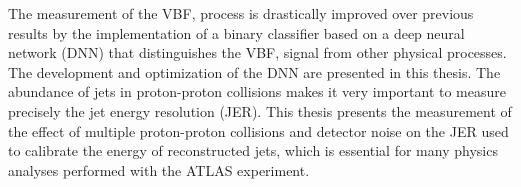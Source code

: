 The measurement of the VBF, \HWW process is drastically improved over previous results by the implementation of a binary classifier based on a deep neural network (DNN) that distinguishes the VBF, \HWW signal from other physical processes. 
The development and optimization of the DNN are presented in this thesis. 
The abundance of jets in proton-proton collisions makes it very important to measure precisely the jet energy resolution (JER). 
This thesis presents the measurement of the effect of multiple proton-proton collisions and detector noise on the JER used to calibrate the energy of reconstructed jets, which is essential for many physics analyses performed with the ATLAS experiment. 



